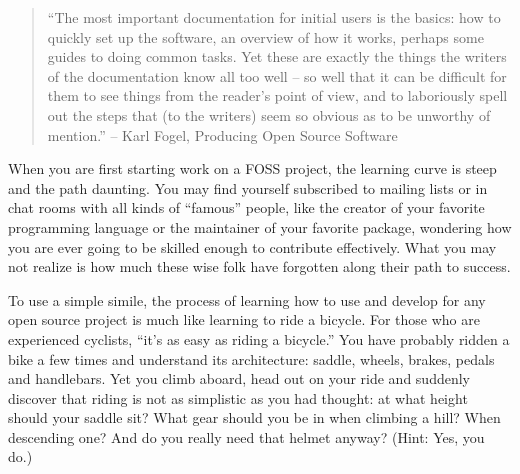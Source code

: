

\begin{quote}
``The most important documentation for initial users is the basics: how to
quickly set up the software, an overview of how it works, perhaps some guides to
doing common tasks. Yet these are exactly the things the writers of the
documentation know all too well -- so well that it can be difficult for them to see
things from the reader's point of view, and to laboriously spell out the steps
that (to the writers) seem so obvious as to be unworthy of mention.'' -- Karl
Fogel, Producing Open Source Software
\end{quote}

When you are first starting work on a FOSS project, the learning curve is steep
and the path daunting. You may find yourself subscribed to mailing lists or in
chat rooms with all kinds of ``famous'' people, like the creator of your
favorite programming language or the maintainer of your favorite package,
wondering how you are ever going to be skilled enough to contribute effectively.
What you may not realize is how much these wise folk have forgotten along their
path to success.

To use a simple simile, the process of learning how to use and develop for any
open source project is much like learning to ride a bicycle. For those who are
experienced cyclists, ``it’s as easy as riding a bicycle.'' You have probably
ridden a bike a few times and understand its architecture: saddle, wheels,
brakes, pedals and handlebars. Yet you climb aboard, head out on your ride and
suddenly discover that riding is not as simplistic as you had thought: at what
height should your saddle sit? What gear should you be in when climbing a hill?
When descending one? And do you really need that helmet anyway? (Hint: Yes, you
do.) 

